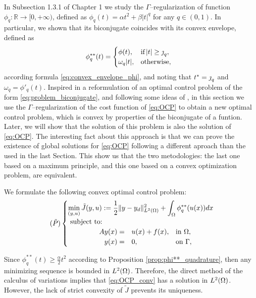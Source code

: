 	In Subsection 1.3.1 of Chapter 1 we study the $\Gamma$--regularization of function 
	$\phi_q:\mathbb{R}\to [0,+\infty)$, defined as $\phi_q(t) = \alpha t^2 + \beta |t|^q$ for any $q\in(0,1)$. 
	In particular, we shown that its biconjugate coincides with its convex envelope, defined as
	\[
	\phi_q^{**}(t)=\begin{cases}
		\phi(t), & \text{if} \, |t|\ge \operatorname{\jmath}_q,\\
		\omega_q|t|,   & \text{otherwise},
	\end{cases}
	\]
	according formula \eqref{eq:convex_envelope_phi}, and noting that $t^*=\operatorname{\jmath}_q$ and
	 $\omega_q=\phi'_q(t)$. Inspired in a reformulation of an optimal control problem of the
	 form \eqref{eq:problem_biconjugate}, and following some ideas of \cite{ito-kunisch2014}, in this 
	section we use the $\Gamma$--regularization of the cost function of \eqref{eq:OCP} to obtain a new
	 optimal control problem, which is convex by properties of the biconjugate of a funtion. Later, 
	we will show that the solution of this problem is also the solution of \eqref{eq:OCP}. The interesting
	fact about this approach is that we can prove the existence of global solutions for \eqref{eq:OCP} following
	a different aproach than the used in the last Section. This show us that the two metodologies: the last one
	based on a maximum principle, and this one based on a convex optimization problem, are equivalent.

We formulate the following convex optimal control problem:
\begin{equation}
		\tag{$\tilde P$} \label{eq:OCP_conv}
		\begin{cases}
			\displaystyle\min_{(y,u)} \tilde J(y,u) := \frac12 \lVert y-y_d \rVert^2_{L^2(\Omega)} + \int_\Omega \phi^{**}_q (u(x)) dx \\
			\hbox{ subject to: }\\
			\hspace{40pt}\begin{array}{rll}
				A y(x) =&u(x) + f(x), &\hbox{in  } \Omega, \\
				y(x)=&0, &\hbox{on  }  \Gamma,
			\end{array}
		\end{cases}   
	\end{equation}

Since $\phi_q^{**}(t)\geq \frac{\alpha}{2}t^2$ according to Proposition \ref{prop:phi**_quadrature}, then any minimizing 
sequence is bounded in $L^2(\Omega)$. Therefore, the direct method of the calculus of variations implies that 
\eqref{eq:OCP_conv} has a solution in $L^2(\Omega)$. However, the lack of strict convexity of $\tilde J$ prevents 
its uniqueness.

